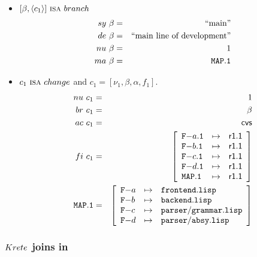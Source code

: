\documentclass[fleqn, 10pt, a4paper]{article}
\begin{document}
\begin{itemize}
\item $[\beta, \langle c_1\rangle]\ \mbox{\textsc{isa}}\ \mathnormal{branch}$
\begin{eqnarray*}
\mathnormal{sy}\ \beta &=& \mbox{``main''} \\
\mathnormal{de}\ \beta &=& \mbox{``main line of development''} \\
\mathnormal{nu}\ \beta &=& 1 \\
\mathnormal{ma}\ \beta &=& \mathtt{MAP.1}
\end{eqnarray*}

\item $c_1\ \mbox{\textsc{isa}}\ \mathnormal{change}$ and
$c_1=[\nu_1, \beta, \alpha, f_1]$.
\begin{eqnarray*}
\mathnormal{nu}\ c_1 &=& 1 \\
\mathnormal{br}\ c_1 &=& \beta \\
\mathnormal{ac}\ c_1 &=& \mathsf{cvs} \\
\mathnormal{fi}\ c_1 &=& \left[
\begin{array}{lcl}
\mathtt{F-}a\mathtt{.1} & \mapsto & \mathsf{r1.1} \\
\mathtt{F-}b\mathtt{.1} & \mapsto & \mathsf{r1.1} \\
\mathtt{F-}c\mathtt{.1} & \mapsto & \mathsf{r1.1} \\
\mathtt{F-}d\mathtt{.1} & \mapsto & \mathsf{r1.1} \\
\mathtt{MAP.1}         & \mapsto & \mathsf{r1.1} \\
\end{array}\right] \\
\mathtt{MAP.1} &=& \left[
\begin{array}{lcl}
\mathtt{F-}a &\mapsto& \mathtt{frontend.lisp} \\
\mathtt{F-}b &\mapsto& \mathtt{backend.lisp} \\
\mathtt{F-}c &\mapsto& \mathtt{parser/grammar.lisp} \\
\mathtt{F-}d &\mapsto& \mathtt{parser/absy.lisp} \\
\end{array}\right]
\end{eqnarray*}
\end{itemize}

\subsubsection{$\mathnormal{Krete}$ joins in}
\end{document}
